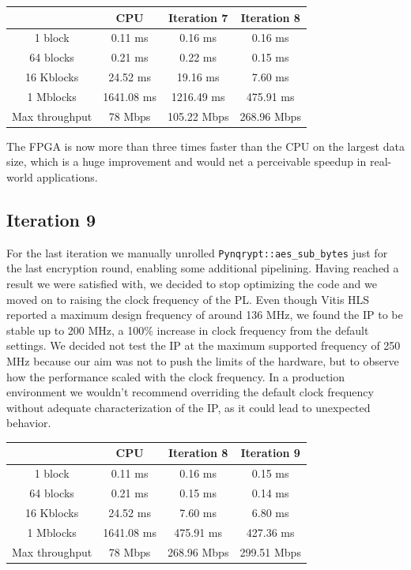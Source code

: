 \documentclass[12pt,oneside,a4paper]{article}
\begin{document}
\begin{table}[h!]
	\centering
	\begin{tabular}{cccc}
		\toprule
		 & CPU & Iteration 7 & Iteration 8 \\
		\midrule
		1 block & 0.11 ms & 0.16 ms & 0.16 ms \\
		64 blocks & 0.21 ms & 0.22 ms & 0.15 ms \\
		16 Kblocks & 24.52 ms & 19.16 ms & 7.60 ms \\
		1 Mblocks & 1641.08 ms & 1216.49 ms & 475.91 ms \\
		Max throughput & 78 Mbps & 105.22 Mbps & 268.96 Mbps \\
		\bottomrule
	\end{tabular}
\end{table}

The FPGA is now more than three times faster than the CPU on the largest data size, which is a huge improvement and would net a perceivable speedup in real-world applications.

\subsection{Iteration 9} \label{subsec:iter9}
For the last iteration we manually unrolled \texttt{Pynqrypt::aes\_sub\_bytes} just for the last encryption round, enabling some additional pipelining.
Having reached a result we were satisfied with, we decided to stop optimizing the code and we moved on to raising the clock frequency of the PL.
Even though Vitis HLS reported a maximum design frequency of around 136 MHz, we found the IP to be stable up to 200 MHz, a 100\% increase in clock frequency from the default settings.
We decided not test the IP at the maximum supported frequency of 250 MHz because our aim was not to push the limits of the hardware, but to observe how the performance scaled with the clock frequency.
In a production environment we wouldn't recommend overriding the default clock frequency without adequate characterization of the IP, as it could lead to unexpected behavior.

\begin{table}[h!]
	\centering
	\begin{tabular}{cccc}
		\toprule
		 & CPU & Iteration 8 & Iteration 9 \\
		\midrule
		1 block & 0.11 ms & 0.16 ms & 0.15 ms \\
		64 blocks & 0.21 ms & 0.15 ms & 0.14 ms \\
		16 Kblocks & 24.52 ms & 7.60 ms & 6.80 ms \\
		1 Mblocks & 1641.08 ms & 475.91 ms & 427.36 ms \\
		Max throughput & 78 Mbps & 268.96 Mbps & 299.51 Mbps \\
		\bottomrule
	\end{tabular}
\end{table}
\end{document}
